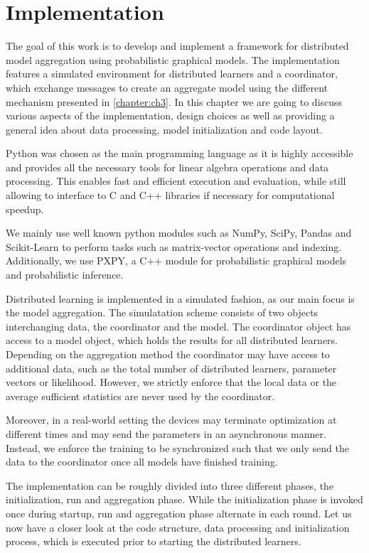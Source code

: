 
\chapter{Implementation}
\label{chapter:ch4}
The goal of this work is to develop and implement a framework for distributed model aggregation using probabilistic graphical models.
The implementation features a simulated environment for distributed learners and a coordinator, which exchange messages to create an aggregate model using the different mechanism presented in \chap \ref{chapter:ch3}.
In this chapter we are going to  discuss various aspects of the implementation, design choices as well as providing a general idea about data processing, model initialization and code layout.

Python was chosen as the main programming language as it is highly accessible and provides all the necessary tools for linear algebra operations and data processing.
This enables fast and efficient execution and evaluation, while still allowing to interface to C and C++  libraries if necessary for computational speedup.

We mainly use well known python modules such as NumPy, SciPy, Pandas and Scikit-Learn to perform tasks such as matrix-vector operations and indexing.
Additionally, we use PXPY, a C++ module for probabilistic graphical models and probabilistic inference.

Distributed learning is implemented in a simulated fashion, as our main focus is the model aggregation.
The simulatation scheme consists of two objects interchanging data, the coordinator and the model. 
The coordinator object has access to a model object, which holds the results for all distributed learners.
Depending on the aggregation method the coordinator may have access to additional data, such as the total number of distributed learners, parameter vectors or likelihood. 
However, we strictly enforce that the local data or the average sufficient statistics are never used by the coordinator.

Moreover, in a real-world setting the devices may terminate optimization at different times and may send the parameters in an asynchronous manner. 
Instead, we enforce the training to be synchronized such that we only send the data to the coordinator once all models have finished training.

The implementation can be roughly divided into three different phases, the initialization, run and aggregation phase.
While the initialization phase is invoked once during startup, run and aggregation phase alternate in each round.
Let us now have a closer look at the code structure, data processing and initialization process, which is executed prior to starting the distributed learners. 

